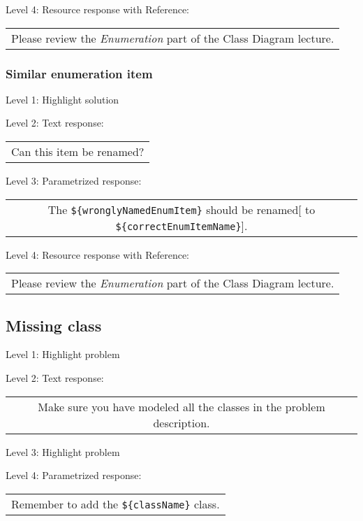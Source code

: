 \noindent Level 4: Resource response with Reference:

\begin{tabular}{|c}
Please review the \textit{Enumeration} part of the Class Diagram lecture.
\end{tabular} \medskip


\subsubsection{Similar enumeration item}

\noindent Level 1: Highlight solution \medskip

\noindent Level 2: Text response: \medskip

\begin{tabular}{|c}
Can this item be renamed?
\end{tabular} \medskip

\noindent Level 3: Parametrized response: \medskip

\begin{tabular}{|c}
The \verb|${wronglyNamedEnumItem}| should be renamed[ to \verb|${correctEnumItemName}|].
\end{tabular} \medskip

\noindent Level 4: Resource response with Reference:

\begin{tabular}{|c}
Please review the \textit{Enumeration} part of the Class Diagram lecture.
\end{tabular} \medskip


\subsection{Missing class}

\noindent Level 1: Highlight problem \medskip

\noindent Level 2: Text response: \medskip

\begin{tabular}{|c}
Make sure you have modeled all the classes in the problem description.
\end{tabular} \medskip

\noindent Level 3: Highlight problem \medskip

\noindent Level 4: Parametrized response: \medskip

\begin{tabular}{|c}
Remember to add the \verb|${className}| class.
\end{tabular} \medskip


